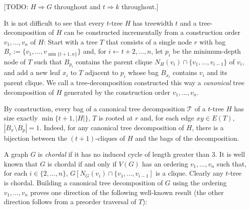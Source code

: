 \documentclass[kpfonts]{patmorin}
\theoremstyle{named}
\begin{document}
[TODO: $H\Rightarrow G$ throughout and $t\Rightarrow k$ throughout.]

It is not difficult to see that every $t$-tree $H$ has treewidth $t$ and a tree-decomposition of $H$ can be constructed incrementally from a construction order $v_1,\ldots,v_n$ of $H$: Start with a tree $T$ that consists of a single node $r$ with bag $B_r:=\{v_1,\ldots,v_{\min\{t+1,n\}}\}$ and, for $i\gets t+2,\ldots,n$, let $p_i$ be the minimum-depth node of $T$ such that $B_{p_i}$ contains the parent clique $N_H(v_i)\cap\{v_1,\ldots,v_{i-1}\}$ of $v_i$, and add a new leaf $x_i$ to $T$ adjacent to $p_i$ whose bag $B_{x_i}$ contains $v_i$ and its parent clique.  We call a tree-decomposition constructed this way a \emph{canonical} tree decomposition of $H$ generated by the construction order $v_1,\ldots,v_n$.

By construction, every bag of a canonical tree decomposition $\mathcal{T}$ of a $t$-tree $H$ has size exactly $\min\{t+1,|H|\}$, $T$ is rooted at $r$ and, for each edge $xy\in E(T)$, $|B_x\setminus B_p|=1$.  Indeed, for any canonical tree decomposition of $H$, there is a bijection between the $(t+1)$-cliques of $H$ and the bags of the decomposition.

A graph $G$ is \emph{chordal} if it has no induced cycle of length greater than 3.  It is well known that $G$ is chordal if and only if $V(G)$ has an ordering $v_1,\ldots,v_n$ such that, for each $i\in\{2,\ldots,n\}$, $G[N_G(v_i)\cap\{v_1,\ldots,v_{i-1}]$ is a clique.  Clearly any $t$-tree is chordal.  Building a canonical tree decomposition of $G$ using the ordering $v_1,\ldots,v_n$ proves one direction of the following well-known result (the other direction follows from a preorder traversal of $T$):

\end{document}
